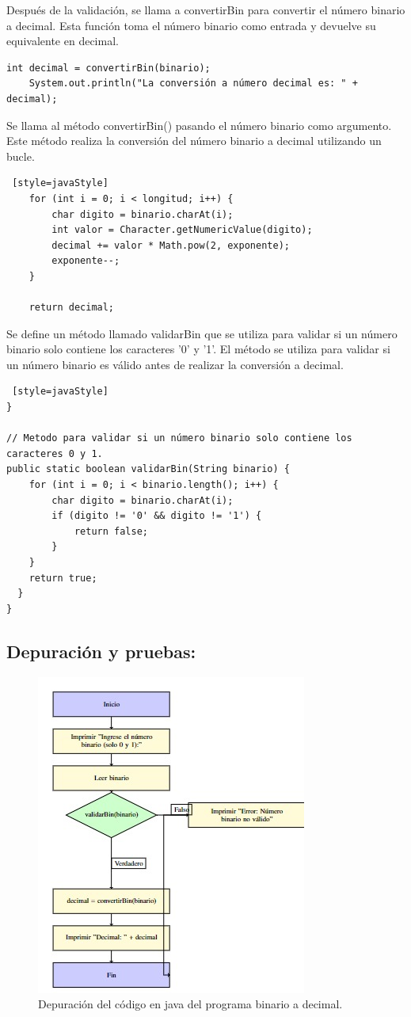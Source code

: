Después de la validación, se llama a convertirBin para convertir el número binario a decimal. Esta función toma el número binario como entrada y devuelve su equivalente en decimal.
\begin{lstlisting}[style=javaStyle] 
    int decimal = convertirBin(binario);
    System.out.println("La conversión a número decimal es: " + decimal);
\end{lstlisting}
Se llama al método convertirBin() pasando el número binario como argumento. Este método realiza la conversión del número binario a decimal utilizando un bucle.
\begin{lstlisting} [style=javaStyle] 
    for (int i = 0; i < longitud; i++) {
        char digito = binario.charAt(i);
        int valor = Character.getNumericValue(digito);
        decimal += valor * Math.pow(2, exponente);
        exponente--;
    }

    return decimal;

\end{lstlisting}
Se define un método llamado validarBin que se utiliza para validar si un número binario solo contiene los caracteres '0' y '1'.  El método se utiliza para validar si un número binario es válido antes de realizar la conversión a decimal.
\begin{lstlisting} [style=javaStyle] 
}

// Metodo para validar si un número binario solo contiene los caracteres 0 y 1.
public static boolean validarBin(String binario) {
    for (int i = 0; i < binario.length(); i++) {
        char digito = binario.charAt(i);
        if (digito != '0' && digito != '1') {
            return false;
        }
    }
    return true;
  }
}
\end{lstlisting}

\subsection{\textbf{Depuración y pruebas:}}
\begin{figure}[h!]
    \centering
    \includegraphics[width = 7.5 cm]{LaTeX/latex-imagenes/fig.1.jpeg}
    \caption{Depuración del código en java del programa binario a decimal.}
    \label{fig:DepuraciónCodigo}
\end{figure}

